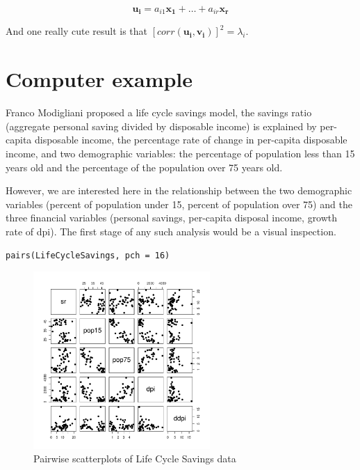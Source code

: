 \begin{displaymath}
\boldsymbol{u_{i}} = a_{i1} \boldsymbol{x_{1}} + \ldots + a_{ir} \boldsymbol{x_{r}}
\end{displaymath}

And one really cute result is that $\left[corr(\boldsymbol{u_{i}}, \boldsymbol{v_{i}})\right]^{2} = \lambda_{i}$.

\section{Computer example}

Franco Modigliani proposed a life cycle savings model, the savings ratio (aggregate personal saving divided by disposable income) is explained by per-capita disposable income, the percentage rate of change in per-capita disposable income, and two demographic variables: the percentage of population less than 15 years old and the percentage of the population over 75 years old. 

However, we are interested here in the relationship between the two demographic variables (percent of population under 15, percent of population over 75) and the three financial variables (personal savings, per-capita disposal income, growth rate of dpi).   The first stage of any such analysis would be a visual inspection.


\begin{verbatim}
pairs(LifeCycleSavings, pch = 16)
\end{verbatim}

\begin{figure}
\begin{center}
\includegraphics[width = 0.6\textwidth]{images/cancor}
\caption{Pairwise scatterplots of Life Cycle Savings data}
\end{center}
\end{figure}

